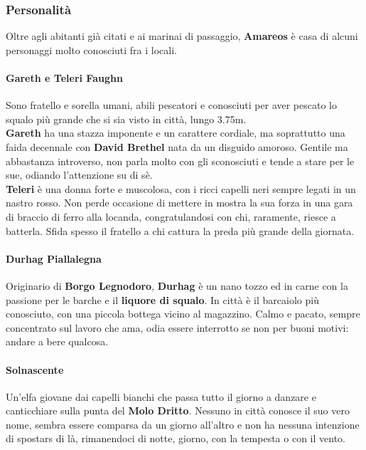 \documentclass[10pt,twoside,onecolumn,openany]{book}
\begin{document}
\subsubsection{Personalità}
Oltre agli abitanti già citati e ai marinai di passaggio, \textbf{Amareos} è casa di alcuni personaggi molto conosciuti fra i locali.
\begin{multicols}{2}
\paragraph{Gareth e Teleri Faughn}
Sono fratello e sorella umani, abili pescatori e conosciuti per aver pescato lo squalo più grande che si sia visto in città, lungo 3.75m.\\
\textbf{Gareth} ha una stazza imponente e un carattere cordiale, ma soprattutto una faida decennale con \textbf{David Brethel} nata da un disguido amoroso. Gentile ma abbastanza introverso, non parla molto con gli sconosciuti e tende a stare per le sue, odiando l'attenzione su di sè.\\
\textbf{Teleri} è una donna forte e muscolosa, con i ricci capelli neri sempre legati in un nastro rosso. Non perde occasione di mettere in mostra la sua forza in una gara di braccio di ferro alla locanda, congratulandosi con chi, raramente, riesce a batterla. Sfida spesso il fratello a chi cattura la preda più grande della giornata.\\
\paragraph{Durhag Piallalegna} Originario di \textbf{Borgo Legnodoro}, \textbf{Durhag} è un nano tozzo ed in carne con la passione per le barche e il \textbf{liquore di squalo}. In città è il barcaiolo più conosciuto, con una piccola bottega vicino al magazzino. Calmo e pacato, sempre concentrato sul lavoro che ama, odia essere interrotto se non per buoni motivi: andare a bere qualcosa.\\
\paragraph{Solnascente} Un'elfa giovane dai capelli bianchi che passa tutto il giorno a danzare e canticchiare sulla punta del \textbf{Molo Dritto}. Nessuno in città conosce il suo vero nome, sembra essere comparsa da un giorno all'altro e non ha nessuna intenzione di spostars di là, rimanendoci di notte, giorno, con la tempesta o con il vento.\\
\end{multicols}
\newpage
\end{document}
